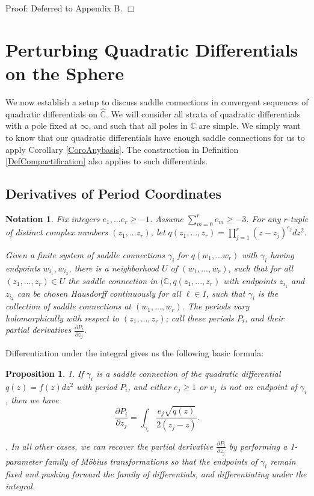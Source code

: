 \documentclass[12pt]{article}
\newtheorem{proposition}[theorem]{Proposition}
\newtheorem{notation}[theorem]{Notation}
\newcommand{\cc}{\mathbb{C}}
\begin{document}
\noindent Proof: Deferred to Appendix B. $\Box$

\section{Perturbing Quadratic Differentials on the Sphere}

\noindent We now establish a setup to discuss saddle connections in convergent sequences of quadratic differentials on $\hat{\cc}$. We will consider all strata of quadratic differentials with a pole fixed at $\infty$, and such that all poles in $\cc$ are simple. We simply want to know that our quadratic differentials have enough saddle connections for us to apply Corollary \ref{CoroAnybasis}. The construction in Definition \ref{DefCompactification} also applies to such differentials.\\

\subsection{Derivatives of Period Coordinates}

\begin{notation}\label{NotaModelnotation}
Fix integers $e_1,...e_r \geq -1$. Assume $\sum\limits_{m = 0}^r e_m \geq -3$. For any $r$-tuple of distinct complex numbers $(z_1,...z_r)$, let $q(z_1,...,z_r) = \prod\limits_{j = 1}^r (z - z_j)^{e_j}dz^2$.

Given a finite system of saddle connections $\gamma_i$ for $q(w_1,...w_r)$ with $\gamma_i$ having endpoints $w_{i_1},w_{i_2}$, there is a neighborhood $U$ of $(w_1,...,w_r)$, such that for all $(z_1,...,z_r) \in U$ the saddle connection in $(\cc,q(z_1,...,z_r)$ with endpoints $z_{i_1}$ and $z_{i_2}$ can be chosen Hausdorff continuously for all $\ell \in I$, such that $\gamma_i$ is the collection of saddle connections at $(w_1,...,w_r)$. The periods vary holomorphically with respect to $(z_1,...,z_r)$; call these periods $P_i$, and their partial derivatives $\frac{\partial P_i}{\partial z_j}$.
\end{notation}

\noindent Differentiation under the integral gives us the following basic formula:

\begin{proposition}\label{PropDifunderint}1. If $\gamma_i$ is a saddle connection of the quadratic differential $q(z) = f(z)dz^2$ with period $P_i$, and either $e_j \geq 1$ or $v_j$ is not an endpoint of $\gamma_i$, then we have $$\frac{\partial P_i}{\partial z_j} = \int_{\gamma_i} \frac{e_j\sqrt{q(z)}}{2(z_j - z)}.$$

. In all other cases, we can recover the partial derivative $\frac{\partial P_i}{\partial z_j}$ by performing a 1-parameter family of M\"obius transformations so that the endpoints of $\gamma_i$ remain fixed and pushing forward the family of differentials, and differentiating under the integral.\end{proposition}
\end{document}
